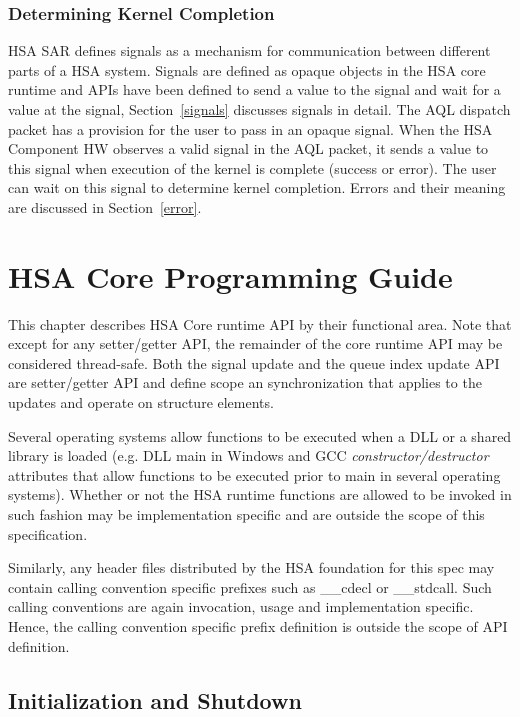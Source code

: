 \documentclass[final]{book}
\newcommand{\mariotodo}[1]{\todo[color=CarnationPink]{#1}}
\begin{document}
\subsection{Determining Kernel Completion}
HSA SAR defines signals as a mechanism for communication between different parts
of a HSA system. Signals are defined as opaque objects in the HSA core runtime
and APIs have been defined to send a value to the signal and wait for a value at
the signal, Section~\ref{signals} discusses signals in detail. The AQL dispatch
packet has a provision for the user to pass in an opaque signal. When the HSA
Component HW observes a valid signal in the AQL packet, it sends a value to this
signal when execution of the kernel is complete (success or error). The user can
wait on this signal to determine kernel completion. Errors and their meaning are
discussed in Section~\ref{error}.



\chapter{HSA Core Programming Guide} \label{coreapi}

\mariotodo{Surreal intro}This chapter describes HSA Core runtime API by their
functional area. Note that except for any setter/getter API, the remainder of
the core runtime API may be considered thread-safe. Both the signal update and
the queue index update API are setter/getter API and define scope an
synchronization that applies to the updates and operate on structure elements.

Several operating systems allow functions to be executed when a DLL or a shared
library is loaded (e.g. DLL main in Windows and GCC
\emph{constructor/destructor} attributes that allow functions to be executed
prior to main in several operating systems). Whether or not the HSA runtime
functions are allowed to be invoked in such fashion may be implementation
specific and are outside the scope of this specification.

Similarly, any header files distributed by the HSA foundation for this spec may
contain calling convention specific prefixes such as __cdecl or
__stdcall. Such calling conventions are again invocation, usage and
implementation specific. Hence, the calling convention specific prefix
definition is outside the scope of API definition.

\section{Initialization and Shutdown}\label{init}
\end{document}
